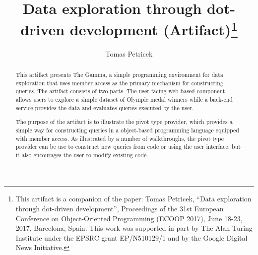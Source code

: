 \documentclass[a4paper,UKenglish]{darts}
\title{Data exploration through dot-driven development (Artifact)\footnote{This artifact is a companion of the paper:  Tomas Petricek, ``Data exploration through dot-driven development'', Proceedings of the 31st European Conference on Object-Oriented Programming (ECOOP 2017), June 18-23, 2017, Barcelona, Spain.  This work was supported in part by The Alan Turing Institute under the EPSRC grant EP/N510129/1 and by the Google Digital News Initiative.}}
\author[1]{Tomas Petricek}
\affil[1]{The Alan Turing Institute, London, UK\\
 and Microsoft Research, Cambridge, UK\\
  \texttt{tomas@tomasp.net}}
\begin{document}
\maketitle

\begin{abstract}
This artifact presents The Gamma, a simple programming environment for data exploration
that uses member access as the primary mechanism for constructing queries. The artifact 
consists of two parts. The user facing web-based component allows users to explore a simple
dataset of Olympic medal winners while a back-end service provides the data and evaluates
queries executed by the user.

The purpose of the artifact is to illustrate the pivot type provider, which provides a simple
way for constructing queries in a object-based programming language equipped with member 
access. As illustrated by a number of walkthroughs, the pivot type provider can be use to
construct new queries from code or using the user interface, but it also encourages the user
to modify existing code.  
\end{abstract}
\end{document}
